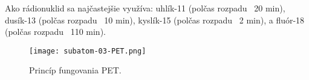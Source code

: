 \documentclass[../../main.tex]{subfiles}
\begin{document}
Ako rádionuklid sa najčastejšie využíva: uhlík-11 (polčas rozpadu ~20 min), dusík-13 (polčas rozpadu ~10 min), kyslík-15 (polčas rozpadu ~2 min), a fluór-18 (polčas rozpadu ~110 min).

\begin{figure}[!h]
\texttt{[image: subatom-03-PET.png]}
\centering
\caption{Princíp fungovania PET.}
\label{sf3:fig:pet}
\end{figure}
\end{document}
